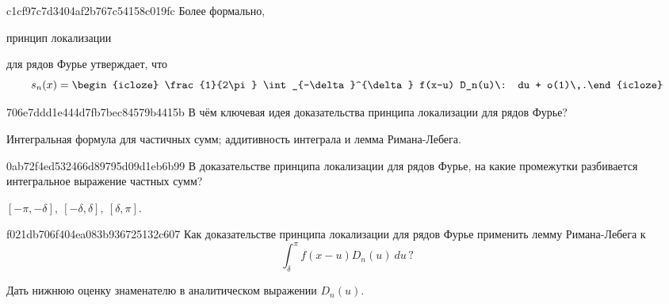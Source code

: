\begin{note}{c1cf97c7d3404af2b767c54158c019fc}
    Более формально, \begin{icloze}{2}принцип локализации\end{icloze} для рядов Фурье утверждает, что
    \[
        s_n(x) = \begin{icloze}{1}\frac{1}{2\pi} \int_{-\delta}^{\delta} f(x-u) D_n(u)\: du + o(1)\,.\end{icloze}
    \]
\end{note}

\begin{note}{706e7ddd1e444d7fb7bec84579b4415b}
    В чём ключевая идея доказательства принципа локализации для рядов Фурье?

    \begin{cloze}{1}
        Интегральная формула для частичных сумм; аддитивность интеграла и лемма Римана-Лебега.
    \end{cloze}
\end{note}

\begin{note}{0ab72f4ed532466d89795d09d1eb6b99}
    В доказательстве принципа локализации для рядов Фурье, на какие промежутки разбивается интегральное выражение частных сумм?

    \begin{cloze}{1}
        \({ [-\pi, -\delta],\: [-\delta, \delta],\: [\delta, \pi] }\).
    \end{cloze}
\end{note}

\begin{note}{f021db706f404ea083b936725132c607}
    Как доказательстве принципа локализации для рядов Фурье применить лемму Римана-Лебега к
    \[
        \int_{\delta}^{\pi} f(x - u) D_n(u)\: du\,?
    \]

    \begin{cloze}{1}
        Дать нижнюю оценку знаменателю в аналитическом выражении \({ D_n(u) }\).
    \end{cloze}
\end{note}


